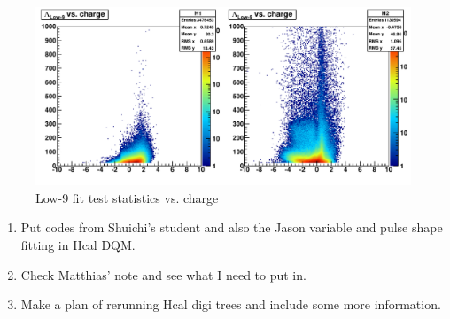 \begin{figure}
   \includegraphics[width=120mm]{DailyLog/6324/6324HTestStatisticsLow9VsCharge.pdf}
   \caption{Low-9 fit test statistics vs. charge}
   \label{Figure_6324HTestStatisticsLow9VsCharge}
\end{figure}



\begin{enumerate}
\item Put codes from Shuichi's student and also the Jason variable and pulse shape fitting in Hcal DQM.
\item Check Matthias' note and see what I need to put in.
\item Make a plan of rerunning Hcal digi trees and include some more information.
\end{enumerate}



